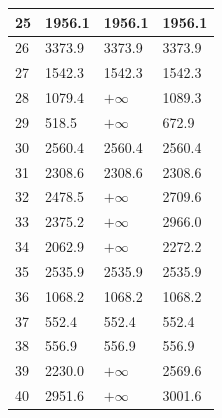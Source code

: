 \begin{longtable}{@{}p{}p{}p{}p{}@{}}
\hline
25 & 1956.1 & 1956.1 & 1956.1 \\
\hline
26 & 3373.9 & 3373.9 & 3373.9 \\
\hline
27 & 1542.3 & 1542.3 & 1542.3 \\
\hline
28 & 1079.4 & $+\infty$ & 1089.3 \\
\hline
29 & 518.5 & $+\infty$ & 672.9 \\
\hline
30 & 2560.4 & 2560.4 & 2560.4 \\
\hline
31 & 2308.6 & 2308.6 & 2308.6 \\
\hline
32 & 2478.5 & $+\infty$ & 2709.6 \\
\hline
33 & 2375.2 & $+\infty$ & 2966.0 \\
\hline
34 & 2062.9 & $+\infty$ & 2272.2 \\
\hline
35 & 2535.9 & 2535.9 & 2535.9 \\
\hline
36 & 1068.2 & 1068.2 & 1068.2 \\
\hline
37 & 552.4 & 552.4 & 552.4 \\
\hline
38 & 556.9 & 556.9 & 556.9 \\
\hline
39 & 2230.0 & $+\infty$ & 2569.6 \\
\hline
40 & 2951.6 & $+\infty$ & 3001.6 \\
\hline
\end{longtable}
